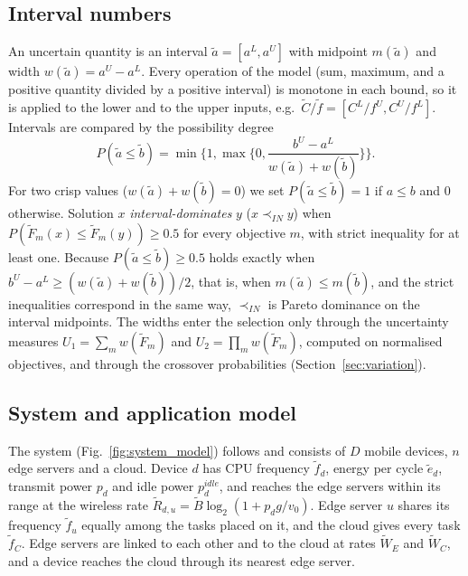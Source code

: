 \subsection{Interval numbers}
\label{sec:intervals}
An uncertain quantity is an interval $\tilde a = [a^L, a^U]$ with midpoint $m(\tilde a)$ and width $w(\tilde a) =
a^U - a^L$. Every operation of the model (sum, maximum, and a positive quantity divided by a positive interval) is
monotone in each bound, so it is applied to the lower and to the upper inputs, e.g.\ $\tilde C / \tilde f = [C^L / f^U,
C^U / f^L]$. Intervals are compared by the possibility degree \citep{jin2026imoeadqn}
\begin{equation}
P(\tilde a \le \tilde b) = \min\Big\{1, \max\Big\{0, \frac{b^U - a^L}{w(\tilde a) + w(\tilde b)}\Big\}\Big\}.
\label{eq:possibility}
\end{equation}
For two crisp values ($w(\tilde a) + w(\tilde b) = 0$) we set $P(\tilde a \le \tilde b) = 1$ if $a \le b$ and $0$
otherwise. Solution $x$ \emph{interval-dominates} $y$ ($x \prec_{IN} y$) when $P(\tilde F_m(x) \le \tilde F_m(y)) \ge
0.5$ for every objective $m$, with strict inequality for at least one. Because $P(\tilde a \le \tilde b) \ge 0.5$ holds
exactly when $b^U - a^L \ge (w(\tilde a) + w(\tilde b))/2$, that is, when $m(\tilde a) \le m(\tilde b)$, and the strict
inequalities correspond in the same way, $\prec_{IN}$ is Pareto dominance on the interval midpoints. The widths enter
the selection only through the uncertainty measures $U_1 = \sum_m w(\tilde F_m)$ and $U_2 = \prod_m w(\tilde F_m)$,
computed on normalised objectives, and through the crossover probabilities (Section~\ref{sec:variation}).

\subsection{System and application model}
The system (Fig.~\ref{fig:system_model}) follows \citet{jin2026imoeadqn} and consists of $D$ mobile devices, $n$ edge
servers and a cloud. Device $d$ has CPU frequency $\tilde f_d$, energy per cycle $\tilde e_d$, transmit power $p_d$ and idle power
$p^{idle}_d$, and reaches the edge servers within its range at the wireless rate $\tilde R_{d,u} = \tilde B \log_2(1 + p_d
g / v_0)$. Edge server $u$ shares its frequency $\tilde f_u$ equally among the tasks placed on it, and the cloud gives
every task $\tilde f_C$. Edge servers are linked to each other and to the cloud at rates $\tilde W_E$ and $\tilde W_C$,
and a device reaches the cloud through its nearest edge server.

